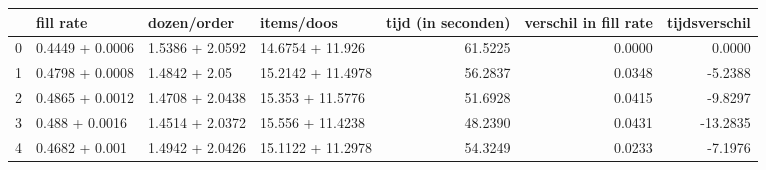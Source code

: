 \begin{tabular}{llllrrr}
\toprule
{} &        fill rate &      dozen/order &         items/doos &  tijd (in seconden) &  verschil in fill rate &  tijdsverschil \\
\midrule
0 &  0.4449 + 0.0006 &  1.5386 + 2.0592 &   14.6754 + 11.926 &             61.5225 &                 0.0000 &         0.0000 \\
1 &  0.4798 + 0.0008 &    1.4842 + 2.05 &  15.2142 + 11.4978 &             56.2837 &                 0.0348 &        -5.2388 \\
2 &  0.4865 + 0.0012 &  1.4708 + 2.0438 &   15.353 + 11.5776 &             51.6928 &                 0.0415 &        -9.8297 \\
3 &   0.488 + 0.0016 &  1.4514 + 2.0372 &   15.556 + 11.4238 &             48.2390 &                 0.0431 &       -13.2835 \\
4 &   0.4682 + 0.001 &  1.4942 + 2.0426 &  15.1122 + 11.2978 &             54.3249 &                 0.0233 &        -7.1976 \\
\bottomrule
\end{tabular}
